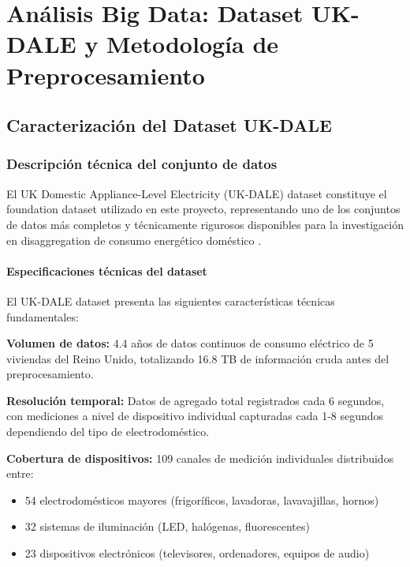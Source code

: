 \chapter{Análisis Big Data: Dataset UK-DALE y Metodología de Preprocesamiento}
\label{ch:big_data_analysis}

\section{Caracterización del Dataset UK-DALE}

\subsection{Descripción técnica del conjunto de datos}

El UK Domestic Appliance-Level Electricity (UK-DALE) dataset constituye el foundation dataset utilizado en este proyecto, representando uno de los conjuntos de datos más completos y técnicamente rigurosos disponibles para la investigación en disaggregation de consumo energético doméstico \cite{kelly2015uk}. 

\subsubsection{Especificaciones técnicas del dataset}

El UK-DALE dataset presenta las siguientes características técnicas fundamentales:

\textbf{Volumen de datos:} 4.4 años de datos continuos de consumo eléctrico de 5 viviendas del Reino Unido, totalizando 16.8 TB de información cruda antes del preprocesamiento.

\textbf{Resolución temporal:} Datos de agregado total registrados cada 6 segundos, con mediciones a nivel de dispositivo individual capturadas cada 1-8 segundos dependiendo del tipo de electrodoméstico.

\textbf{Cobertura de dispositivos:} 109 canales de medición individuales distribuidos entre:
\begin{itemize}
    \item 54 electrodomésticos mayores (frigoríficos, lavadoras, lavavajillas, hornos)
    \item 32 sistemas de iluminación (LED, halógenas, fluorescentes)
    \item 23 dispositivos electrónicos (televisores, ordenadores, equipos de audio)
\end{itemize}

